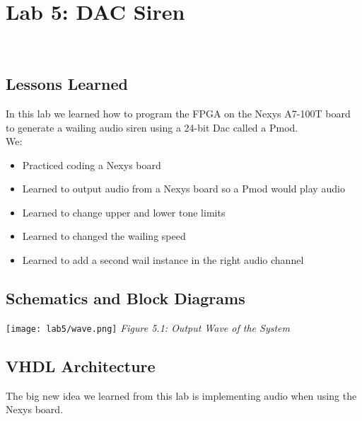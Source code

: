 \chapter{Lab 5: DAC Siren} \\
\label{Introduction}


\section{Lessons Learned
\label{Section::Lessons Learned}}
In this lab we learned how to program the FPGA on the Nexys A7-100T board to generate a wailing audio siren using a 24-bit Dac called a Pmod.  \\
We:
\begin{itemize}
    \item Practiced coding a Nexys board
    \item Learned to output audio from a Nexys board so a Pmod would play audio
    \item Learned to change upper and lower tone limits
    \item Learned to changed the wailing speed
    \item Learned to add a second wail instance in the right audio channel
 \end{itemize}

 \section{Schematics and Block Diagrams}
    \texttt{[image: lab5/wave.png]}
    \emph{Figure 5.1: Output Wave of the System}
 
 \section{VHDL Architecture}
 The big new idea we learned from this lab is implementing audio when using the Nexys board.
 
